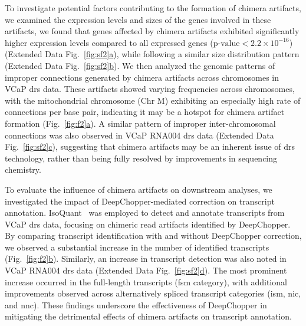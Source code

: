 \documentclass[pdflatex,sn-nature, lineno]{sn-jnl}%
\newcommand{\figref}[2]{Fig.~\hyperref[#1]{\ref*{#1}#2}}
\newcommand{\edfigref}[2]{Extended Data Fig.~\hyperref[#1]{\ref*{#1}#2}}
\begin{document}

To investigate potential factors contributing to the formation of chimera artifacts, we examined the expression levels and sizes of the genes involved in these artifacts, we found that genes affected by chimera artifacts exhibited significantly higher expression levels compared to all expressed genes (\(\textrm{p-value} < 2.2 \times 10^{-16}\)) (\edfigref{fig:sf2}{a}), while following a similar size distribution pattern (\edfigref{fig:sf2}{b}).
We then analyzed the genomic patterns of improper connections generated by chimera artifacts across chromosomes in VCaP \gls{drs} data.
These artifacts showed varying frequencies across chromosomes, with the mitochondrial chromosome (Chr M) exhibiting an especially high rate of connections per base pair, indicating it may be a hotspot for chimera artifact formation (\figref{fig:f2}{a}).
A similar pattern of improper inter-chromosomal connections was also observed in VCaP RNA004 \gls{drs} data (\edfigref{fig:sf2}{c}), suggesting that chimera artifacts may be an inherent issue of \gls{drs} technology, rather than being fully resolved by improvements in sequencing chemistry.

To evaluate the influence of chimera artifacts on downstream analyses, we investigated the impact of DeepChopper-mediated correction on transcript annotation.
IsoQuant~\cite{prjibelski2023accurate} was employed to detect and annotate transcripts from VCaP \gls{drs} data, focusing on chimeric read artifacts identified by DeepChopper.
By comparing transcript identification with and without DeepChopper correction, we observed a substantial increase in the number of identified transcripts (\figref{fig:f2}{b}).
Similarly, an increase in transcript detection was also noted in VCaP RNA004 \gls{drs} data (\edfigref{fig:sf2}{d}).
The most prominent increase occurred in the full-length transcripts (\gls{fsm} category), with additional improvements observed across alternatively spliced transcript categories (\gls{ism}, \gls{nic}, and \gls{nnc}).
These findings underscore the effectiveness of DeepChopper in mitigating the detrimental effects of chimera artifacts on transcript annotation.
\end{document}
